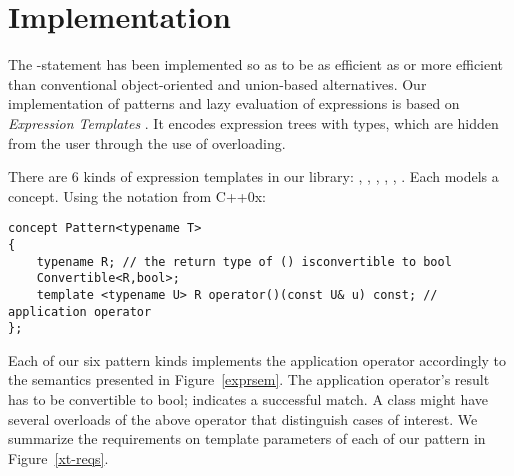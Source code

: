 \section{Implementation} %
\label{sec:impl}

The -statement has been implemented so as to be as efficient as or 
more efficient than conventional object-oriented and union-based 
alternatives\cite{TypeSwitch}. Our implementation of patterns and lazy 
evaluation of expressions is based on \emph{Expression Templates} 
\cite{Veldhuizen95expressiontemplates,vandevoorde2003c++}. It encodes 
expression trees with types, which are hidden from the user through the use of 
overloading.

There are 6 kinds of expression templates in our library: , 
, , , , 
. Each models a  concept.
Using the notation from C++0x\cite{C++0xConcepts}:

\begin{lstlisting}[keepspaces,columns=flexible]
concept Pattern<typename T> 
{
    typename R; // the return type of () isconvertible to bool
    Convertible<R,bool>;
    template <typename U> R operator()(const U& u) const; // application operator
};
\end{lstlisting}

Each of our six pattern kinds 
implements the application operator accordingly to the semantics presented in 
Figure~\ref{exprsem}. The application operator's result has to be 
convertible to bool;
 indicates a successful match. A class might have several overloads of 
the above operator that distinguish cases of interest. We summarize the requirements on template parameters of each of our 
pattern in Figure~\ref{xt-reqs}.

